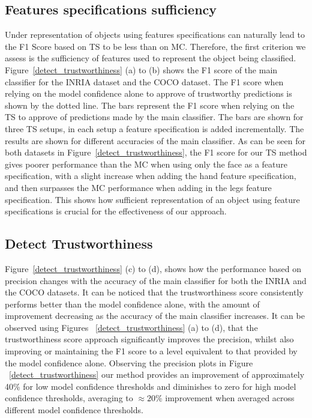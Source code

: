 \subsection{Features specifications sufficiency}
Under representation of objects using features specifications can naturally lead to the F1 Score based on TS to be less than on MC. Therefore, the first criterion we assess is the sufficiency of features used to represent the object being classified.
%
Figure~\ref{detect_trustworthiness} (a) to (b) shows the F1 score of the main classifier for the INRIA dataset and the COCO dataset. The F1 score when relying on the model confidence alone to approve of trustworthy predictions is shown by the dotted line. The bars represent the F1 score when relying on the TS to approve of predictions made by the main classifier. The bars are shown for three TS setups, in each setup a feature specification is added incrementally. 
%
The results are shown for different accuracies of the main classifier. 
%
As can be seen for both datasets in Figure~\ref{detect_trustworthiness}, the F1 score for our TS method gives poorer performance than the MC when using only the face as a feature specification, with a slight increase when adding the hand feature specification, and then surpasses the MC performance when adding in the legs feature specification. 
%
This shows how sufficient representation of an object using feature specifications is crucial for the effectiveness of our approach.

\subsection{Detect Trustworthiness}
Figure~\ref{detect_trustworthiness} (c) to (d), shows how the performance based on precision changes with the accuracy of the main classifier for both the INRIA and the COCO datasets. It can be noticed that the trustworthiness score consistently performs better than the model confidence alone, with the amount of improvement decreasing as the accuracy of the main classifier increases. 
%
It can be observed using Figures ~\ref{detect_trustworthiness} (a) to (d), that the trustworthiness score approach significantly improves the precision, whilst also improving or maintaining the F1 score to a level equivalent to that provided by the model confidence alone.  
%
Observing the precision plots in Figure ~\ref{detect_trustworthiness} our method provides an improvement of approximately 40\% for low model confidence thresholds and diminishes to zero for high model confidence thresholds, averaging to $\approx 20$\% improvement when averaged across different model confidence thresholds.


